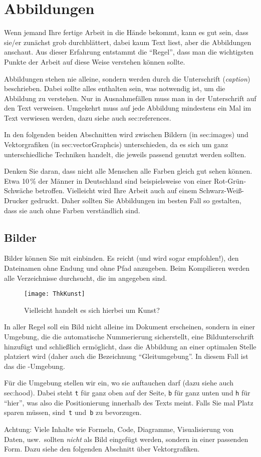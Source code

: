 \section{Abbildungen}
\label{sec:figures}
%
Wenn jemand Ihre fertige Arbeit in die Hände bekommt, kann es gut sein, dass sie/er zunächst grob durchblättert, dabei kaum Text liest, aber die Abbildungen anschaut. Aus dieser Erfahrung entstammt die \enquote{Regel}, dass man die wichtigsten Punkte der Arbeit auf diese Weise verstehen können sollte.
\par
Abbildungen stehen nie alleine, sondern werden durch die Unterschrift (\emph{caption}) beschrieben. Dabei sollte alles enthalten sein, was notwendig ist, um die Abbildung zu verstehen. Nur in Ausnahmefällen muss man in der Unterschrift auf den Text verweisen. Umgekehrt muss auf jede Abbildung mindestens ein Mal im Text verwiesen werden, dazu siehe auch sec:references.
\par
In den folgenden beiden Abschnitten wird zwischen Bildern (in sec:images) und Vektorgrafiken (in sec:vectorGraphcis) unterschieden, da es sich um ganz unterschiedliche Techniken handelt, die jeweils passend genutzt werden sollten.
\par
Denken Sie daran, dass nicht alle Menschen alle Farben gleich gut sehen können. Etwa 10\,\% der Männer in Deutschland sind beispielsweise von einer Rot-Grün-Schwäche betroffen. Vielleicht wird Ihre Arbeit auch auf einem Schwarz-Weiß-Drucker gedruckt. Daher sollten Sie Abbildungen im besten Fall so gestalten, dass sie auch ohne Farben verständlich sind.
%
%
\subsection{Bilder}
\label{sec:images}
%
Bilder können Sie mit  einbinden. Es reicht (und wird sogar empfohlen!), den Dateinamen ohne Endung und ohne Pfad anzugeben. Beim Kompilieren werden alle Verzeichnisse durchsucht, die im  angegeben sind.
%
\begin{figure}[tbh]
 \centering
 \texttt{[image: ThkKunst]}
 \caption{Vielleicht handelt es sich hierbei um Kunst?}
 \label{fig:kunst}
\end{figure}
%
In aller Regel soll ein Bild nicht alleine im Dokument erscheinen, sondern in einer Umgebung, die die automatische Nummerierung sicherstellt, eine Bildunterschrift hinzufügt und schließlich ermöglicht, dass die Abbildung an einer optimalen Stelle platziert wird (daher auch die Bezeichnung \enquote{Gleitumgebung}. In diesem Fall ist das die -Umgebung.
\par
Für die Umgebung stellen wir ein, wo sie auftauchen darf (dazu siehe auch sec:hood). Dabei steht \texttt{t} für ganz oben auf der Seite, \texttt{b} für ganz unten und \texttt{h} für \enquote{hier}, was also die Positionierung innerhalb des Texts meint. Falls Sie mal Platz sparen müssen, sind~\texttt{t} und~\texttt{b} zu bevorzugen.
\par
Achtung: Viele Inhalte wie Formeln, Code, Diagramme, Visualisierung von Daten, usw.\ sollten \emph{nicht} als Bild eingefügt werden, sondern in einer passenden Form. Dazu siehe den folgenden Abschnitt über Vektorgrafiken.
%
%
